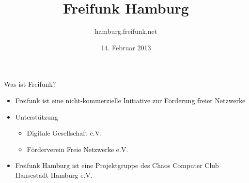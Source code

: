 \documentclass[c]{beamer}
\title{Freifunk Hamburg}
\author{hamburg.freifunk.net}
\date{14. Februar 2013}
\begin{document}
\maketitle



\begin{frame}{Was ist Freifunk?}
	\begin{itemize}
		\item Freifunk ist eine nicht-kommerzielle Initiative zur Förderung freier Netzwerke

		\item Unterstützung
		\begin{itemize}
			\item Digitale Gesellschaft e.V.
			\item Förderverein Freie Netzwerke e.V.
		\end{itemize}

		\item Freifunk Hamburg ist eine Projektgruppe des Chaos Computer Club Hansestadt Hamburg e.V.
	\end{itemize}
\end{frame}
\end{document}
